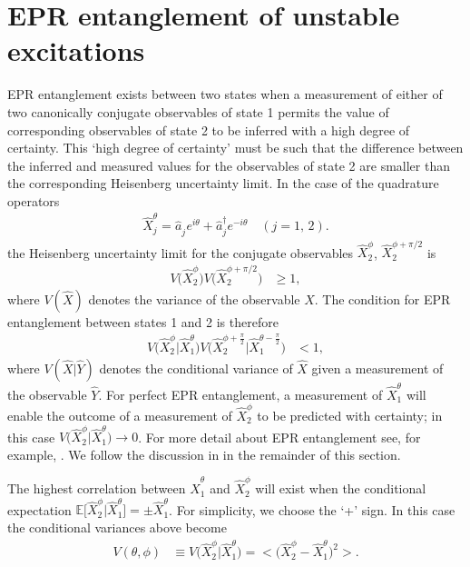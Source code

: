 \section{EPR entanglement of unstable excitations}
\label{FloquetAppendix:EPREntanglement}

EPR entanglement exists between two states when a measurement of either of two canonically conjugate observables of state 1 permits the value of corresponding observables of state 2 to be inferred with a high degree of certainty. This `high degree of certainty' must be such that the difference between the inferred and measured values for the observables of state 2 are smaller than the corresponding Heisenberg uncertainty limit. In the case of the quadrature operators
\begin{align}
    \hat{X}_j^\theta = \hat{a}_j^{\phantom{\dagger}} e^{i \theta} + \hat{a}_j^\dagger e^{-i \theta} \quad (j = 1,\, 2).
\end{align}
the Heisenberg uncertainty limit for the conjugate observables $\hat{X}_2^\phi$, $\hat{X}_2^{\phi + \pi/2}$ is
\begin{align}
    V\big(\hat{X}_2^\phi\big) V\big(\hat{X}_2^{\phi + \pi/2}\big) &\geq 1,
\end{align}
where $V(\hat{X})$ denotes the variance of the observable $\hat{X}$. The condition for EPR entanglement between states 1 and 2 is therefore
\begin{align}
    V\big(\hat{X}_2^\phi \big| \hat{X}_1^\theta\big) V\big(\hat{X}_2^{\phi + \frac{\pi}{2}} \big| \hat{X}_1^{\theta - \frac{\pi}{2}}\big) &< 1,
\end{align}
where $V(\hat{X} | \hat{Y})$ denotes the conditional variance of $\hat{X}$ given a measurement of the observable $\hat{Y}$. For perfect EPR entanglement, a measurement of $\hat{X}_1^{\theta}$ will enable the outcome of a measurement of $\hat{X}_2^\phi$ to be predicted with certainty; in this case $V\big(\hat{X}_2^\phi \big| \hat{X}_1^\theta\big) \rightarrow 0$. For more detail about EPR entanglement see, for example, \citep{WallsMilburn}. We follow the discussion in \citep[\S 5.2.3]{WallsMilburn} in the remainder of this section.

The highest correlation between $\hat{X}_1^\theta$ and $\hat{X}_2^\phi$ will exist when the conditional expectation $\mathbb{E}\big[\hat{X}_2^\phi\big| \hat{X}_1^\theta\big] = \pm\hat{X}_1^\theta$. For simplicity, we choose the `+' sign. In this case the conditional variances above become
\begin{align}
    V(\theta, \phi) &\equiv V\big(\hat{X}_2^\phi \big| \hat{X}_1^{\theta}\big) = \big<\big(\hat{X}_2^\phi - \hat{X}_1^\theta\big)^2\big>.
\end{align}

